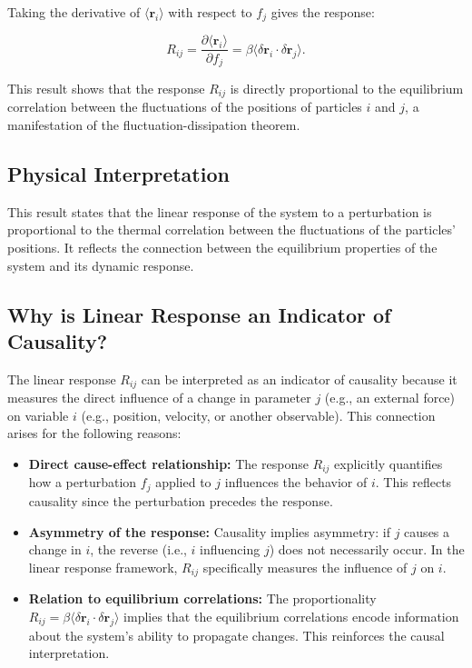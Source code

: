 \documentclass[English, Lau, oneside]{sapthesis}
\begin{document}
\noindent Taking the derivative of $\langle \mathbf{r}_i \rangle$ with respect to $f_j$ gives the response:

\begin{equation}
R_{ij} = \frac{\partial \langle \mathbf{r}_i \rangle}{\partial f_j} = \beta \langle \delta \mathbf{r}_i \cdot \delta \mathbf{r}_j \rangle. \label{response}
\end{equation}

\noindent This result shows that the response $R_{ij}$ is directly proportional to the equilibrium correlation between the fluctuations of the positions of particles $i$ and $j$, a manifestation of the fluctuation-dissipation theorem.

\subsection*{Physical Interpretation}

\noindent This result states that the linear response of the system to a perturbation is proportional to the thermal correlation between the fluctuations of the particles' positions. It reflects the connection between the equilibrium properties of the system and its dynamic response.

\subsection*{Why is Linear Response an Indicator of Causality?}

The linear response \(R_{ij}\) can be interpreted as an indicator of causality because it measures the direct influence of a change in parameter \(j\) (e.g., an external force) on variable \(i\) (e.g., position, velocity, or another observable). This connection arises for the following reasons:

\begin{itemize}
    \item \textbf{Direct cause-effect relationship:} The response \(R_{ij}\) explicitly quantifies how a perturbation \(f_j\) applied to \(j\) influences the behavior of \(i\). This reflects causality since the perturbation precedes the response.
    \item \textbf{Asymmetry of the response:} Causality implies asymmetry: if \(j\) causes a change in \(i\), the reverse (i.e., \(i\) influencing \(j\)) does not necessarily occur. In the linear response framework, \(R_{ij}\) specifically measures the influence of \(j\) on \(i\).
    \item \textbf{Relation to equilibrium correlations:} The proportionality \(R_{ij} = \beta \langle \delta \mathbf{r}_i \cdot \delta \mathbf{r}_j \rangle\) implies that the equilibrium correlations encode information about the system's ability to propagate changes. This reinforces the causal interpretation.
\end{itemize}
\end{document}
